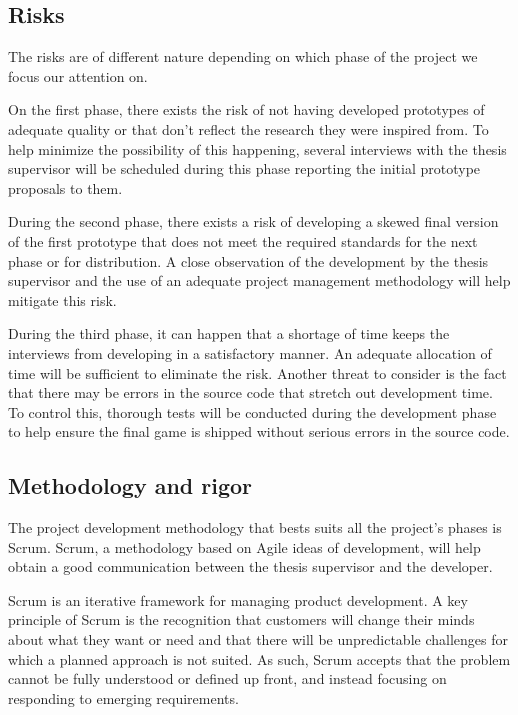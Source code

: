 \subsection{Risks}

The risks are of different nature depending on which phase of the project we focus our attention on.

On the first phase, there exists the risk of not having developed prototypes of adequate quality or that don't reflect the research they were inspired from. To help minimize the possibility of this happening, several interviews with the thesis supervisor will be scheduled during this phase reporting the initial prototype proposals to them.

During the second phase, there exists a risk of developing a skewed final version of the first prototype that does not meet the required standards for the next phase or for distribution. A close observation of the development by the thesis supervisor and the use of an adequate project management methodology will help mitigate this risk.

During the third phase, it can happen that a shortage of time keeps the interviews from developing in a satisfactory manner. An adequate allocation of time will be sufficient to eliminate the risk. Another threat to consider is the fact that there may be errors in the source code that stretch out development time. To control this, thorough tests will be conducted during the development phase to help ensure the final game is shipped without serious errors in the source code. 

\subsection{Methodology and rigor}

The project development methodology that bests suits all the project's phases is Scrum. Scrum, a methodology based on Agile ideas of development, will help obtain a good communication between the thesis supervisor and the developer.

Scrum is an iterative framework for managing product development. A key principle of Scrum is the recognition that customers will change their minds about what they want or need and that there will be unpredictable challenges for which a planned approach is not suited. As such, Scrum accepts that the problem cannot be fully understood or defined up front, and instead focusing on responding to emerging requirements.

